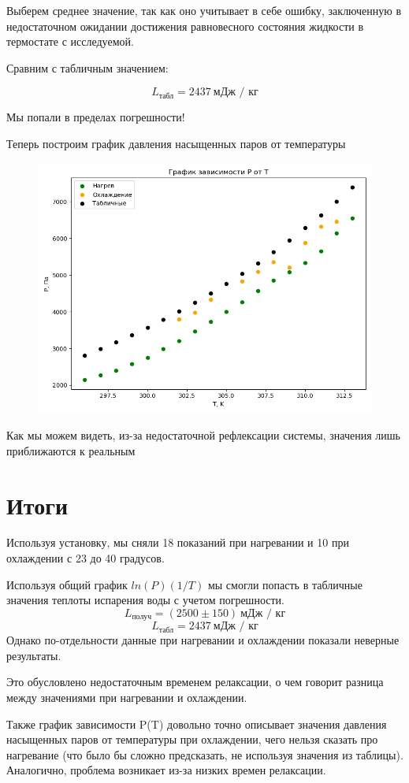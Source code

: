 \documentclass[a4paper]{article}
\begin{document}
Выберем среднее значение, так как оно учитывает в себе ошибку, заключенную
в недостаточном ожидании достижения равновесного состояния жидкости в термостате
с исследуемой.

Сравним с табличным значением:

\begin{equation}
    L_\text{табл} = 2437 \ \text{мДж / кг}
\end{equation}

Мы попали в пределах погрешности!

\newpage

Теперь построим график давления насыщенных паров от температуры

\begin{figure}[h!]
    \centering
    \includegraphics[scale=0.85]{figure2.png}
\end{figure}

Как мы можем видеть, из-за недостаточной рефлексации системы, значения лишь
приближаются к реальным

\section{Итоги}

Используя установку, мы сняли 18 показаний при нагревании и 10 при охлаждении
с 23 до 40 градусов.

Используя общий график $ln(P)(1/T)$ мы смогли попасть в табличные значения теплоты 
испарения воды с учетом погрешности.
\begin{equation*}
    L_\text{получ} = (2500 \pm 150) \ \text{мДж / кг}
\end{equation*}
\begin{equation*}
    L_\text{табл} = 2437 \ \text{мДж / кг}
\end{equation*}
Однако по-отдельности данные при нагревании и охлаждении показали неверные результаты.

Это обусловлено недостаточным временем релаксации, о чем говорит
разница между значениями при нагревании и охлаждении.

Также график зависимости P(T) довольно точно описывает значения 
давления насыщенных паров от температуры при охлаждении, чего нельзя сказать
про нагревание (что было бы сложно предсказать, не используя значения из таблицы).
Аналогично, проблема возникает из-за низких времен релаксации.
\end{document}
